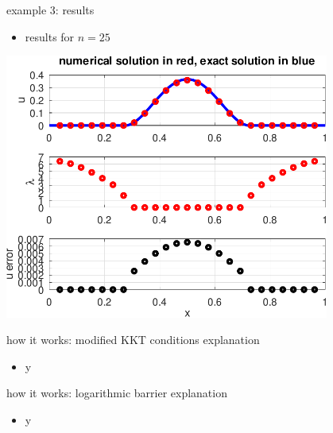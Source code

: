 \documentclass[10pt,hyperref,dvipsnames]{beamer}
\begin{document}
\begin{frame}{example 3: results}

\begin{itemize}
\item results for $n=25$
\end{itemize}

\medskip
\begin{center}
\includegraphics[width=0.8\textwidth]{figs/errorobstacle.pdf}
\end{center}
\end{frame}


\begin{frame}{how it works: modified KKT conditions explanation}

\begin{itemize}
\item y
\end{itemize}
\end{frame}


\begin{frame}{how it works: logarithmic barrier explanation}

\begin{itemize}
\item y
\end{itemize}
\end{frame}
\end{document}
